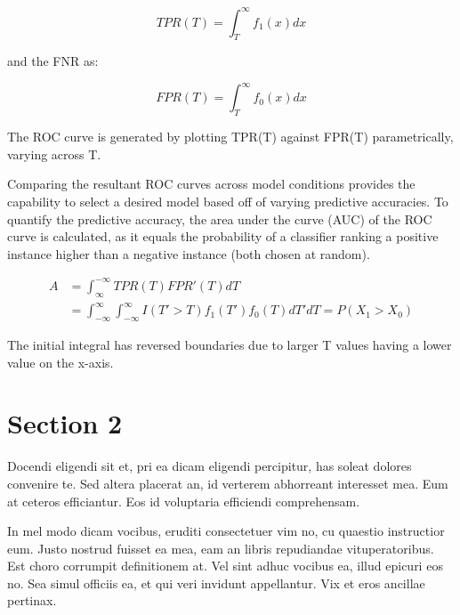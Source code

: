 \begin{equation}
TPR(T) = \int_{T}^{\infty} f_1(x) dx
\end{equation}

and the FNR as:
 
\begin{equation}
FPR(T) = \int_{T}^{\infty} f_0(x) dx
\end{equation}

The ROC curve is generated by plotting TPR(T) against FPR(T) parametrically, varying across T.


Comparing the resultant ROC curves across model conditions provides the capability to select a desired model based off of varying predictive accuracies. To quantify the predictive accuracy, the area under the curve (AUC) of the ROC curve is calculated, as it equals the probability of a classifier ranking a positive instance higher than a negative instance (both chosen at random).

\begin{equation}
\begin{aligned}
A &= \int_{\infty}^{-\infty} TPR(T) FPR' (T) dT \\
  &= \int_{-\infty}^{\infty}\int_{-\infty}^{\infty} I(T' >T)f_1 (T' )f_0 (T) dT' dT = P(X_1 > X_0)
\end{aligned}
\end{equation}

The initial integral has reversed boundaries due to larger T values having a lower value on the x-axis.
  
  


\section{Section 2}\label{APPENDIXA_SECTION2}

Docendi eligendi sit et, pri ea dicam eligendi percipitur, has soleat
dolores convenire te. Sed altera placerat an, id verterem abhorreant
interesset mea. Eum at ceteros efficiantur. Eos id voluptaria efficiendi
comprehensam.

In mel modo dicam vocibus, eruditi consectetuer vim no, cu quaestio
instructior eum. Justo nostrud fuisset ea mea, eam an libris repudiandae
vituperatoribus. Est choro corrumpit definitionem at. Vel sint adhuc vocibus
ea, illud epicuri eos no. Sea simul officiis ea, et qui veri invidunt
appellantur. Vix et eros ancillae pertinax.
